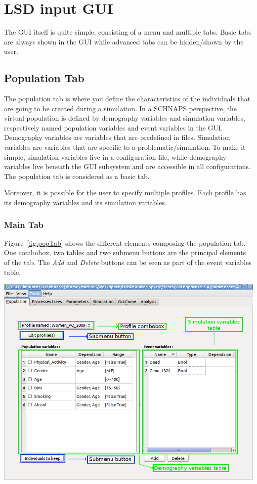 \documentclass[a4paper,11pt]{report}
\begin{document}
\chapter{LSD input GUI}
The GUI itself is quite simple, consisting of a menu and multiple tabs. Basic tabs are always shown in the GUI while advanced tabs can be hidden/shown by the user.

\section{Population Tab}
The population tab is where you define the characteristics of the individuals that are going to be created during a simulation. In a SCHNAPS perspective, the virtual population is defined by demography variables and simulation variables, respectively named population variables and event variables in the GUI. Demography variables are variables that are predefined in files. Simulation variables are variables that are specific to a problematic/simulation. To make it simple, simulation variables live in a configuration file, while demography variables live beneath the GUI subsystem and are accessible in all configurations. The population tab is considered as a basic tab.

Moreover, it is possible for the user to specify multiple profiles. Each profile has its demography variables and its simulation variables.

\subsection{Main Tab}
Figure~\ref{fig:popTab} shows the different elements composing the population tab. One combobox, two tables and two submenu buttons are the principal elements of the tab. The \emph{Add} and \emph{Delete} buttons can be seen as part of the event variables table.
\begin{center}
\includegraphics[scale=0.4]{Pictures/Population/PopulationTab-Arrow.png}
\label{fig:popTab}
\end{center}
\end{document}
